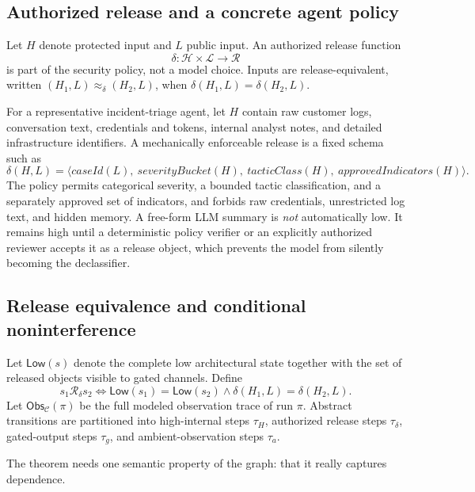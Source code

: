 \documentclass[11pt,letterpaper]{article}
\theoremstyle{plain}
\theoremstyle{definition}
\newcommand{\Low}{\mathsf{Low}}
\newcommand{\Obs}{\mathsf{Obs}}
\newcommand{\Rd}{\mathrel{\mathcal{R}_\delta}}
\begin{document}
\subsection{Authorized release and a concrete agent policy}\label{sec:release-fn}
Let $H$ denote protected input and $L$ public input. An authorized release function
\begin{equation}
\delta : \mathcal{H} \times \mathcal{L} \to \mathcal{R}
\end{equation}
is part of the security policy, not a model choice. Inputs are release-equivalent, written $(H_1, L) \approx_\delta (H_2, L)$, when $\delta(H_1, L) = \delta(H_2, L)$.

For a representative incident-triage agent, let $H$ contain raw customer logs, conversation text, credentials and tokens, internal analyst notes, and detailed infrastructure identifiers. A mechanically enforceable release is a fixed schema such as
\begin{equation}\label{eq:delta}
\delta(H, L) = \langle \mathit{caseId}(L),\ \mathit{severityBucket}(H),\ \mathit{tacticClass}(H),\ \mathit{approvedIndicators}(H)\rangle.
\end{equation}
The policy permits categorical severity, a bounded tactic classification, and a separately approved set of indicators, and forbids raw credentials, unrestricted log text, and hidden memory. A free-form LLM summary is \emph{not} automatically low. It remains high until a deterministic policy verifier or an explicitly authorized reviewer accepts it as a release object, which prevents the model from silently becoming the declassifier.

\subsection{Release equivalence and conditional noninterference}
Let $\Low(s)$ denote the complete low architectural state together with the set of released objects visible to gated channels. Define
\begin{equation}
s_1 \Rd s_2 \iff \Low(s_1) = \Low(s_2) \wedge \delta(H_1, L) = \delta(H_2, L).
\end{equation}
Let $\Obs_{\mathcal{C}}(\pi)$ be the full modeled observation trace of run $\pi$. Abstract transitions are partitioned into high-internal steps $\tau_H$, authorized release steps $\tau_\delta$, gated-output steps $\tau_g$, and ambient-observation steps $\tau_a$.

The theorem needs one semantic property of the graph: that it really captures dependence.
\end{document}
